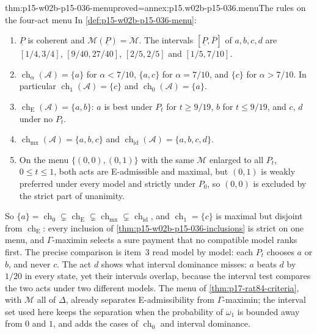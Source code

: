 \begin{hbtheorem}{thm:p15-w02b-p15-036-menu}{proved=annex:p15.w02b-p15-036.menu}{The rules on the four-act menu}
In \cref{def:p15-w02b-p15-036-menu}:
\begin{enumerate}
\item \(\underline P\) is coherent and \(\mathcal M(\underline P)=\mathcal M\).
 The intervals \([\underline P,\overline P]\) of \(a,b,c,d\) are
 \([1/4,3/4]\), \([9/40,27/40]\), \([2/5,2/5]\) and \([1/5,7/10]\).
\item \(\operatorname{ch}_\alpha(\mathcal A)=\{a\}\) for
 \(\alpha<7/10\), \(\{a,c\}\) for \(\alpha=7/10\), and \(\{c\}\) for
 \(\alpha>7/10\). In particular \(\operatorname{ch}_1(\mathcal A)=\{c\}\)
 and \(\operatorname{ch}_0(\mathcal A)=\{a\}\).
\item \(\operatorname{ch}_{\mathrm E}(\mathcal A)=\{a,b\}\):
 \(a\) is best under \(P_t\) for \(t\geq9/19\), \(b\) for \(t\leq9/19\),
 and \(c\), \(d\) under no \(P_t\).
\item \(\operatorname{ch}_{\mathrm{mx}}(\mathcal A)=\{a,b,c\}\) and
 \(\operatorname{ch}_{\mathrm{id}}(\mathcal A)=\{a,b,c,d\}\).
\item On the menu \(\{(0,0),(0,1)\}\) with the same \(\mathcal M\)
 enlarged to all \(P_t\), \(0\leq t\leq1\), both acts are E-admissible and
 maximal, but \((0,1)\) is weakly preferred under every model and strictly
 under \(P_0\), so \((0,0)\) is excluded by the strict part of unanimity.
\end{enumerate}
\end{hbtheorem}

So
\(\{a\}=\operatorname{ch}_0\subsetneq\operatorname{ch}_{\mathrm E}
\subsetneq\operatorname{ch}_{\mathrm{mx}}\subsetneq
\operatorname{ch}_{\mathrm{id}}\), and
\(\operatorname{ch}_1=\{c\}\) is maximal but disjoint from
\(\operatorname{ch}_{\mathrm E}\): every inclusion of
\cref{thm:p15-w02b-p15-036-inclusions} is strict on one menu, and
\(\Gamma\)-maximin selects a sure payment that no compatible model ranks
first. The precise comparison is item~3 read model by model: each \(P_t\)
chooses \(a\) or \(b\), and never \(c\). The act \(d\) shows what interval
dominance misses: \(a\) beats \(d\) by \(1/20\) in every state, yet their
intervals overlap, because the interval test compares the two acts under
two different models. The menu of \cref{thm:p17-rat84-criteria}, with
\(\mathcal M\) all of \(\Delta\), already separates E-admissibility from
\(\Gamma\)-maximin; the interval set used here keeps the separation when
the probability of \(\omega_1\) is bounded away from \(0\) and \(1\), and
adds the cases of \(\operatorname{ch}_0\) and interval dominance.

